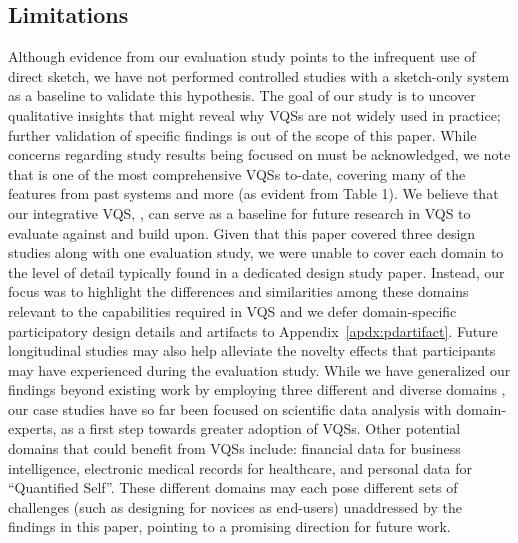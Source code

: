  \subsection{Limitations}%
 \par Although evidence from our evaluation study points to the infrequent use of direct sketch, we have not performed controlled studies with a sketch-only system as a baseline to validate this hypothesis.  The goal of our study is to uncover qualitative insights that might reveal why VQSs are not widely used in practice; further validation of specific findings is out of the scope of this paper. While concerns regarding study results being focused on \zvpp must be acknowledged, we note that \zvpp is one of the most comprehensive VQSs to-date, covering many of the features from past systems and more (as evident from Table 1). We believe that our integrative VQS, \zvpp, can serve as a baseline for future research in VQS to evaluate against and build upon. Given that this paper covered three design studies along with one evaluation study, we were unable to cover each domain to the level of detail typically found in a dedicated design study paper. Instead, our focus was to highlight the differences and similarities among these domains relevant to the capabilities required in VQS and we defer domain-specific participatory design details and artifacts to Appendix~\ref{apdx:pdartifact}. Future longitudinal studies may also help alleviate the novelty effects that participants may have experienced during the evaluation study. While we have generalized our findings beyond existing work by employing three different and diverse domains ,
 our case studies have so far
 been focused on scientific data analysis with domain-experts,
 as a first step towards greater adoption of VQSs.
 Other potential domains that could benefit from VQSs include:
 financial data for business intelligence,
 electronic medical records for healthcare,
 and personal data for ``Quantified Self''.
 These different domains may each pose different sets of challenges (such as designing for novices as end-users) unaddressed by the findings in this paper,
  pointing to a promising direction for future work.